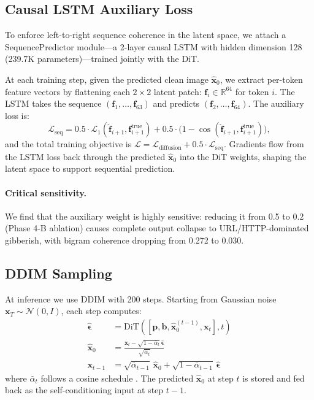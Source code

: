\documentclass[11pt,a4paper]{article}
\begin{document}
\subsection{Causal LSTM Auxiliary Loss}
\label{sec:lstm}

To enforce left-to-right sequence coherence in the latent space, we attach a
SequencePredictor module---a 2-layer causal LSTM \citep{hochreiter1997lstm} with
hidden dimension 128 (239.7K parameters)---trained jointly with the DiT.

At each training step, given the predicted clean image $\hat{\mathbf{x}}_0$, we
extract per-token feature vectors by flattening each $2\times2$ latent patch:
$\mathbf{f}_i \in \mathbb{R}^{64}$ for token $i$.
The LSTM takes the sequence $(\mathbf{f}_1, \ldots, \mathbf{f}_{63})$ and predicts
$(\mathbf{f}_2, \ldots, \mathbf{f}_{64})$.
The auxiliary loss is:
\begin{equation}
  \mathcal{L}_{\text{seq}}
  = 0.5 \cdot \mathcal{L}_1(\hat{\mathbf{f}}_{i+1}, \mathbf{f}_{i+1}^{\text{true}})
  + 0.5 \cdot \bigl(1 - \cos(\hat{\mathbf{f}}_{i+1}, \mathbf{f}_{i+1}^{\text{true}})\bigr),
\end{equation}
and the total training objective is
$\mathcal{L} = \mathcal{L}_{\text{diffusion}} + 0.5 \cdot \mathcal{L}_{\text{seq}}$.
Gradients flow from the LSTM loss back through the predicted $\hat{\mathbf{x}}_0$ into
the DiT weights, shaping the latent space to support sequential prediction.

\paragraph{Critical sensitivity.}
We find that the auxiliary weight is highly sensitive: reducing it from 0.5 to 0.2
(Phase 4-B ablation) causes complete output collapse to URL/HTTP-dominated gibberish,
with bigram coherence dropping from 0.272 to 0.030.

\subsection{DDIM Sampling}
\label{sec:ddim}

At inference we use DDIM \citep{song2020ddim} with 200 steps.
Starting from Gaussian noise $\mathbf{x}_T \sim \mathcal{N}(0,I)$, each step computes:
\begin{align}
  \hat{\boldsymbol{\epsilon}} &= \text{DiT}([\mathbf{p},\mathbf{b},\hat{\mathbf{x}}_0^{(t-1)}, \mathbf{x}_t], t)\\
  \hat{\mathbf{x}}_0 &= \frac{\mathbf{x}_t - \sqrt{1-\bar\alpha_t}\,\hat{\boldsymbol{\epsilon}}}{\sqrt{\bar\alpha_t}}\\
  \mathbf{x}_{t-1} &= \sqrt{\bar\alpha_{t-1}}\,\hat{\mathbf{x}}_0 + \sqrt{1-\bar\alpha_{t-1}}\,\hat{\boldsymbol{\epsilon}}
\end{align}
where $\bar\alpha_t$ follows a cosine schedule \citep{ho2020ddpm}.
The predicted $\hat{\mathbf{x}}_0$ at step $t$ is stored and fed back as the
self-conditioning input at step $t-1$.
\end{document}
